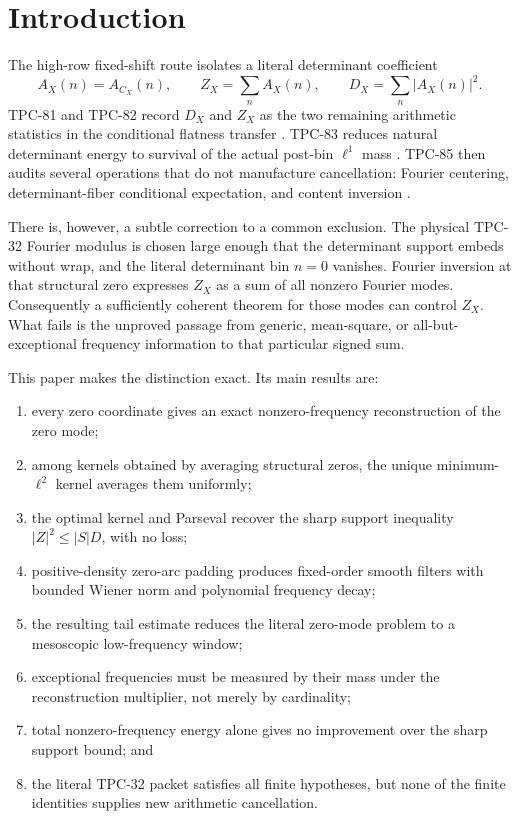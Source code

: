 \section{Introduction}
\label{sec:introduction}

The high-row fixed-shift route isolates a literal determinant
coefficient
\[
 A_X(n)=A_{C_X}(n),\qquad
 Z_X=\sum_nA_X(n),\qquad
 D_X=\sum_n|A_X(n)|^2.
\]
TPC-81 and TPC-82 record \(D_X\) and \(Z_X\) as the two remaining
arithmetic statistics in the conditional flatness transfer
\citep{WangTPC81,WangTPC82}.  TPC-83 reduces natural determinant
energy to survival of the actual post-bin \(\ell^1\) mass
\citep{WangTPC83}.  TPC-85 then audits several operations that do not
manufacture cancellation: Fourier centering, determinant-fiber
conditional expectation, and content inversion
\citep{WangTPC85}.

There is, however, a subtle correction to a common exclusion.
The physical TPC-32 Fourier modulus is chosen large enough that the
determinant support embeds without wrap, and the literal determinant
bin \(n=0\) vanishes.  Fourier inversion at that structural zero
expresses \(Z_X\) as a sum of all nonzero Fourier modes.  Consequently
a sufficiently coherent theorem for those modes can control \(Z_X\).
What fails is the unproved passage from generic, mean-square, or
all-but-exceptional frequency information to that particular signed
sum.

This paper makes the distinction exact.  Its main results are:
\begin{enumerate}[label=(\roman*),leftmargin=2.2em]
\item every zero coordinate gives an exact nonzero-frequency
reconstruction of the zero mode;
\item among kernels obtained by averaging structural zeros, the
unique minimum-\(\ell^2\) kernel averages them uniformly;
\item the optimal kernel and Parseval recover the sharp support
inequality \(|Z|^2\le |S|D\), with no loss;
\item positive-density zero-arc padding produces fixed-order smooth
filters with bounded Wiener norm and polynomial frequency decay;
\item the resulting tail estimate reduces the literal zero-mode
problem to a mesoscopic low-frequency window;
\item exceptional frequencies must be measured by their mass under
the reconstruction multiplier, not merely by cardinality;
\item total nonzero-frequency energy alone gives no improvement over
the sharp support bound; and
\item the literal TPC-32 packet satisfies all finite hypotheses, but none of
the finite identities supplies new arithmetic cancellation.
\end{enumerate}

